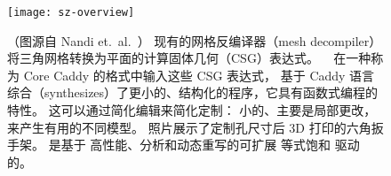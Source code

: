 \begin{figure}
  \centering
  \texttt{[image: sz-overview]}
  \caption[Szalinski decompiles flat CSG into structured CAD]{
  （图源自 Nandi et.\ al.\ \cite{szalinski}）
  现有的网格反编译器（mesh decompiler）将三角网格转换为平面的计算固体几何（CSG）表达式。
  \sz~\cite{szalinski} 在一种称为 Core Caddy 的格式中输入这些 CSG 表达式，
    基于 Caddy 语言综合（synthesizes）了更小的、结构化的程序，它具有函数式编程的特性。 
    这可以通过简化编辑来简化定制：
      小的、主要是局部更改，来产生有用的不同模型。
    照片展示了定制孔尺寸后 3D 打印的六角扳手架。
    \sz 是基于 \egg 高性能、\eclass 分析和动态重写的可扩展 等式饱和 驱动的。
  }
  \label{fig:sz-overview}
\end{figure}


